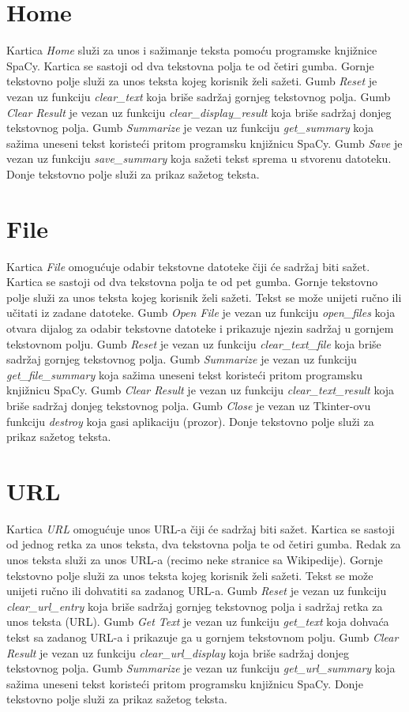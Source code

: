 \documentclass[times, utf8, zavrsni, numeric]{fer}
\begin{document}
\section{Home}
Kartica \emph{Home} služi za unos i sažimanje teksta pomoću programske knjižnice SpaCy.
Kartica se sastoji od dva tekstovna polja te od četiri gumba.
Gornje tekstovno polje služi za unos teksta kojeg korisnik želi sažeti.
Gumb \emph{Reset} je vezan uz funkciju \emph{clear\_text} koja briše sadržaj gornjeg tekstovnog polja.
Gumb \emph{Clear Result} je vezan uz funkciju \emph{clear\_display\_result} koja briše sadržaj donjeg tekstovnog polja.
Gumb \emph{Summarize} je vezan uz funkciju \emph{get\_summary} koja sažima uneseni tekst koristeći pritom programsku knjižnicu SpaCy.
Gumb \emph{Save} je vezan uz funkciju \emph{save\_summary} koja sažeti tekst sprema u stvorenu datoteku.
Donje tekstovno polje služi za prikaz sažetog teksta.
\section{File}
Kartica \emph{File} omogućuje odabir tekstovne datoteke čiji će sadržaj biti sažet.
Kartica se sastoji od dva tekstovna polja te od pet gumba.
Gornje tekstovno polje služi za unos teksta kojeg korisnik želi sažeti. Tekst se može unijeti ručno ili učitati iz zadane datoteke.
Gumb \emph{Open File} je vezan uz funkciju \emph{open\_files} koja otvara dijalog za odabir tekstovne datoteke i prikazuje njezin sadržaj u gornjem tekstovnom polju.
Gumb \emph{Reset} je vezan uz funkciju \emph{clear\_text\_file} koja briše sadržaj gornjeg tekstovnog polja.
Gumb \emph{Summarize} je vezan uz funkciju \emph{get\_file\_summary} koja sažima uneseni tekst koristeći pritom programsku knjižnicu SpaCy.
Gumb \emph{Clear Result} je vezan uz funkciju \emph{clear\_text\_result} koja briše sadržaj donjeg tekstovnog polja.
Gumb \emph{Close} je vezan uz Tkinter-ovu funkciju \emph{destroy} koja gasi aplikaciju (prozor).
Donje tekstovno polje služi za prikaz sažetog teksta.
\section{URL}
Kartica \emph{URL} omogućuje unos URL-a čiji će sadržaj biti sažet.
Kartica se sastoji od jednog retka za unos teksta, dva tekstovna polja te od četiri gumba.
Redak za unos teksta služi za unos URL-a (recimo neke stranice sa Wikipedije).
Gornje tekstovno polje služi za unos teksta kojeg korisnik želi sažeti. Tekst se može unijeti ručno ili dohvatiti sa zadanog URL-a.
Gumb \emph{Reset} je vezan uz funkciju \emph{clear\_url\_entry} koja briše sadržaj gornjeg tekstovnog polja i sadržaj retka za unos teksta (URL).
Gumb \emph{Get Text} je vezan uz funkciju \emph{get\_text} koja dohvaća tekst sa zadanog URL-a i prikazuje ga u gornjem tekstovnom polju.
Gumb \emph{Clear Result} je vezan uz funkciju \emph{clear\_url\_display} koja briše sadržaj donjeg tekstovnog polja.
Gumb \emph{Summarize} je vezan uz funkciju \emph{get\_url\_summary} koja sažima uneseni tekst koristeći pritom programsku knjižnicu SpaCy.
Donje tekstovno polje služi za prikaz sažetog teksta.
\end{document}
